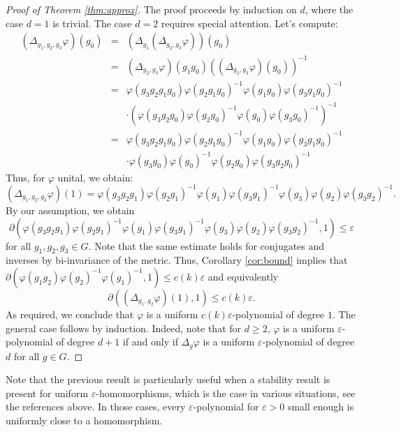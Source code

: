 \documentclass[a4paper,11pt]{amsproc}
\theoremstyle{plain}
\theoremstyle{definition}
\begin{document}
\begin{proof}[Proof of Theorem \ref{thm:approx}]
The proof proceeds by induction on $d$, where the case $d=1$ is trivial. The case $d=2$ requires special attention. Let's compute:
\begin{eqnarray*}
(\Delta_{g_1,g_2,g_3} \varphi)(g_0) &=& (\Delta_{g_1}(\Delta_{g_2,g_3}  \varphi))(g_0) \\
&=& (\Delta_{g_2,g_3}  \varphi)(g_1g_0) ((\Delta_{g_2,g_3}  \varphi)(g_0))^{-1} \\
&=&\varphi(g_3g_2g_1g_0) \varphi(g_2g_1g_0)^{-1} \varphi(g_1g_0) \varphi(g_3g_1g_0)^{-1} \\
&& \cdot (\varphi(g_3g_2g_0) \varphi(g_2g_0)^{-1} \varphi(g_0) \varphi(g_3g_0)^{-1})^{-1} \\
&=&\varphi(g_3g_2g_1g_0) \varphi(g_2g_1g_0)^{-1} \varphi(g_1g_0) \varphi(g_3g_1g_0)^{-1} \\
&& \cdot \varphi(g_3g_0)\varphi(g_0)^{-1}\varphi(g_2g_0)\varphi(g_3g_2g_0)^{-1}
\end{eqnarray*}
Thus, for $\varphi$ unital, we obtain:
\begin{equation*}
(\Delta_{g_1,g_2,g_3} \varphi)(1)=
\varphi(g_3g_2g_1) \varphi(g_2g_1)^{-1} \varphi(g_1) \varphi(g_3g_1)^{-1} \varphi(g_3)\varphi(g_2)\varphi(g_3g_2)^{-1}.
\end{equation*}
By our assumption, we obtain
$$\partial(\varphi(g_3g_2g_1) \varphi(g_2g_1)^{-1} \varphi(g_1) \varphi(g_3g_1)^{-1} \varphi(g_3)\varphi(g_2)\varphi(g_3g_2)^{-1},1) \leq \varepsilon$$ for all $g_1,g_2,g_3 \in G$. Note that the same estimate holds for conjugates and inverses by bi-invariance of the metric. Thus, Corollary \ref{cor:bound} implies that $\partial(\varphi(g_1g_2)\varphi(g_2)^{-1}\varphi(g_1)^{-1},1)\leq c(k) \varepsilon$ and equivalently
$$\partial((\Delta_{g_1,g_2}\varphi)(1),1) \leq c(k) \varepsilon.$$
As required, we conclude that $\varphi$ is a uniform $c(k)\varepsilon$-polynomial of degree $1$. The general case follows by induction. Indeed, note that for $d \geq 2$, $\varphi$ is a uniform $\varepsilon$-polynomial of degree $d+1$ if and only if $\Delta_g \varphi$ is a uniform $\varepsilon$-polynomial of degree $d$ for all $g \in G.$
\end{proof}

Note that the previous result is particularly useful when a stability result is present for uniform $\varepsilon$-homomorphisms, which is the case in various situations, see the references above. In those cases, every $\varepsilon$-polynomial for $\varepsilon>0$ small enough is uniformly close to a homomorphism.
\end{document}
